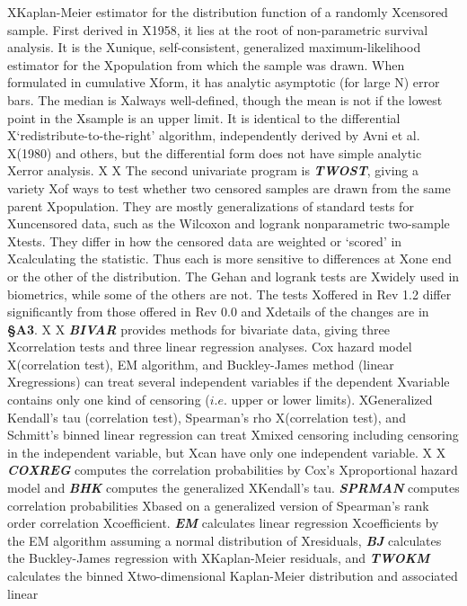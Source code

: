 XKaplan-Meier estimator for the distribution function of a randomly 
Xcensored sample.  First derived in 
X1958, it lies at the root of non-parametric survival analysis.  It is the
Xunique, self-consistent, generalized maximum-likelihood estimator for the
Xpopulation from which the sample was drawn. When formulated in cumulative 
Xform, it has analytic asymptotic (for large N) error bars. The median is
Xalways well-defined, though the mean is not if the lowest point in the 
Xsample is an upper limit.  It is identical to the differential 
X`redistribute-to-the-right' algorithm, independently derived by Avni et al.
X(1980) and others, but the differential form does not have simple analytic 
Xerror analysis.  
X
X     The second univariate program is {\sl\bf TWOST}, giving a variety 
Xof ways to test whether two censored samples are drawn from the same parent
Xpopulation.  They are mostly generalizations of standard tests for
Xuncensored data, such as the Wilcoxon and logrank nonparametric two-sample
Xtests.  They differ in how the censored data are weighted or `scored' in
Xcalculating the statistic.  Thus each is more sensitive to differences at
Xone end or the other of the distribution.  The Gehan and logrank tests are
Xwidely used in biometrics, while some of the others are not.  The tests 
Xoffered in Rev 1.2 differ significantly from those offered in Rev 0.0 and
Xdetails of the changes are in {\bf \S A3}.
X
X     {\sl\bf BIVAR} provides methods for bivariate data,  giving three 
Xcorrelation tests and three linear regression analyses. Cox hazard model 
X(correlation test), EM algorithm, and Buckley-James method (linear 
Xregressions) can treat several independent variables if the dependent 
Xvariable contains only one kind of censoring ($i.e.$ upper or lower limits). 
XGeneralized Kendall's tau (correlation  test), Spearman's rho 
X(correlation test), and Schmitt's binned linear regression can treat 
Xmixed censoring including censoring in the independent variable, but 
Xcan have only one independent variable.  
X
X	{\sl\bf COXREG} computes the correlation probabilities by Cox's 
Xproportional hazard model and {\sl\bf BHK} computes the generalized 
XKendall's tau.  {\sl\bf SPRMAN} computes correlation probabilities 
Xbased on a generalized version of Spearman's rank order correlation 
Xcoefficient.  {\sl\bf EM} calculates linear regression 
Xcoefficients by  the EM algorithm assuming a normal distribution of
Xresiduals, {\sl\bf BJ} calculates the Buckley-James regression with 
XKaplan-Meier residuals, and {\sl\bf TWOKM} calculates the binned 
Xtwo-dimensional Kaplan-Meier distribution and  associated linear 
